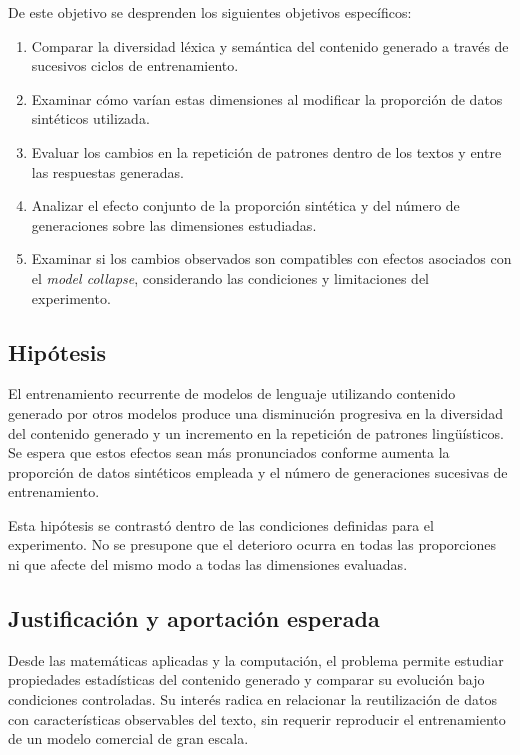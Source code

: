\documentclass[12pt,letterpaper]{article}
\begin{document}
De este objetivo se desprenden los siguientes objetivos específicos:
\begin{enumerate}
    \item Comparar la diversidad léxica y semántica del contenido generado
    a través de sucesivos ciclos de entrenamiento.
    \item Examinar cómo varían estas dimensiones al modificar la proporción
    de datos sintéticos utilizada.
    \item Evaluar los cambios en la repetición de patrones dentro de los
    textos y entre las respuestas generadas.
    \item Analizar el efecto conjunto de la proporción sintética y del
    número de generaciones sobre las dimensiones estudiadas.
    \item Examinar si los cambios observados son compatibles con efectos
    asociados con el \textit{model collapse}, considerando las condiciones
    y limitaciones del experimento.
\end{enumerate}

\subsection{Hipótesis}
El entrenamiento recurrente de modelos de lenguaje utilizando contenido generado por otros modelos produce una disminución progresiva en la diversidad del contenido generado y un incremento en la repetición de patrones lingüísticos. Se espera que estos efectos sean más pronunciados conforme aumenta la proporción de datos sintéticos empleada y el número de generaciones sucesivas de entrenamiento.

Esta hipótesis se contrastó dentro de las condiciones definidas para
el experimento. No se presupone que el deterioro ocurra en todas las
proporciones ni que afecte del mismo modo a todas las dimensiones evaluadas.

\subsection{Justificación y aportación esperada}

Desde las matemáticas aplicadas y la computación, el problema permite
estudiar propiedades estadísticas del contenido generado y comparar su
evolución bajo condiciones controladas. Su interés radica en relacionar
la reutilización de datos con características observables del texto, sin
requerir reproducir el entrenamiento de un modelo comercial de gran escala.
\end{document}
